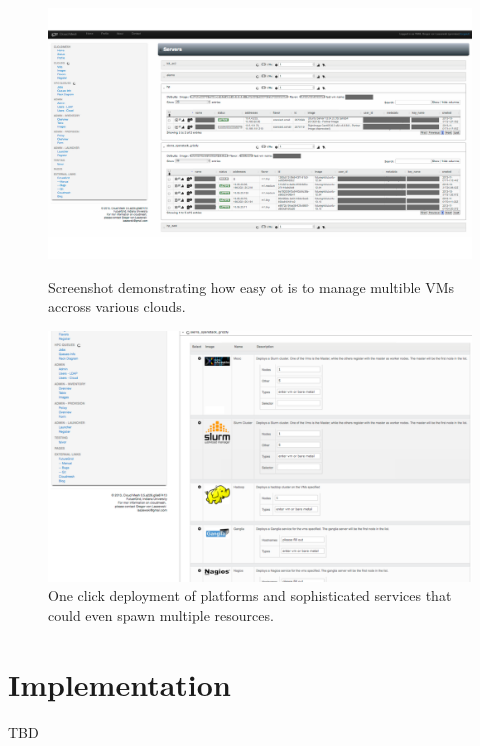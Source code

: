 \documentclass{tex/sig-alternate-2013}
\begin{document}
\begin{figure}[htb]
  \centering
    \includegraphics[width=1.0\columnwidth]{images/instances.pdf}
  \caption{Screenshot demonstrating how easy ot is to manage multible VMs accross various clouds.}\label{F:instances}
  \centering
    \includegraphics[width=1.0\columnwidth]{images/oneclick.pdf}
  \caption{One click deployment of platforms and sophisticated
    services that could even spawn multiple resources.}\label{F:oneclick}
\end{figure}


\section{Implementation}\label{S:implementation}

TBD
\end{document}
